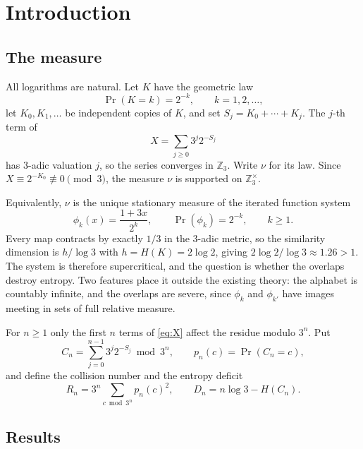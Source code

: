 \documentclass[11pt,reqno]{amsart}
\theoremstyle{plain}
\theoremstyle{definition}
\theoremstyle{remark}
\newcommand{\Zthree}{\mathbb{Z}_3}
\newcommand{\Prob}{\operatorname{Pr}}
\begin{document}
\section{Introduction}

\subsection{The measure}
All logarithms are natural. Let $K$ have the geometric law
\begin{equation}
\Prob(K=k)=2^{-k},\qquad k=1,2,\ldots,
\label{eq:gaplaw}
\end{equation}
let $K_0,K_1,\ldots$ be independent copies of $K$, and set
$S_j=K_0+\cdots+K_j$. The $j$-th term of
\begin{equation}
X=\sum_{j\ge0}3^j2^{-S_j}
\label{eq:X}
\end{equation}
has $3$-adic valuation $j$, so the series converges in $\Zthree$. Write
$\nu$ for its law. Since $X\equiv2^{-K_0}\not\equiv0\pmod3$, the measure
$\nu$ is supported on $\Zthree^\times$.

Equivalently, $\nu$ is the unique stationary measure of the iterated
function system
\begin{equation}
\phi_k(x)=\frac{1+3x}{2^k},\qquad \Prob(\phi_k)=2^{-k},\qquad k\ge1 .
\label{eq:ifs}
\end{equation}
Every map contracts by exactly $1/3$ in the $3$-adic metric, so the
similarity dimension is $h/\log3$ with $h=H(K)=2\log2$, giving
$2\log2/\log3\approx1.26>1$. The system is therefore supercritical, and the
question is whether the overlaps destroy entropy. Two features place it
outside the existing theory: the alphabet is countably infinite, and the
overlaps are severe, since $\phi_k$ and $\phi_{k'}$ have images meeting in
sets of full relative measure.

For $n\ge1$ only the first $n$ terms of \eqref{eq:X} affect the residue
modulo $3^n$. Put
\begin{equation}
C_n=\sum_{j=0}^{n-1}3^j2^{-S_j}\bmod 3^n,
\qquad p_n(c)=\Prob(C_n=c),
\label{eq:Cn}
\end{equation}
and define the collision number and the entropy deficit
\begin{equation}
R_n=3^n\sum_{c\bmod 3^n}p_n(c)^2,
\qquad
D_n=n\log3-H(C_n).
\label{eq:RnDn}
\end{equation}

\subsection{Results}
\end{document}
